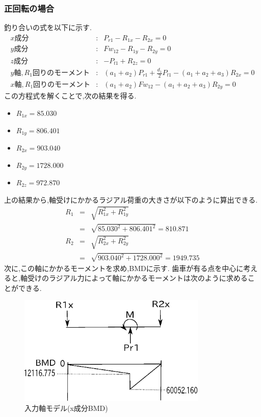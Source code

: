 \subsubsection{正回転の場合}
釣り合いの式を以下に示す.
\begin{eqnarray}
x成分&:&P_{r1}-R_{1x}-R_{2x}=0\\
y成分&:&Fw_{12}-R_{1y}-R_{2y}=0\\
z成分&:&-P_{t1}+R_{2z}=0\\
y軸,R_1回りのモーメント&:&(a_1+a_2)P_{r1}+\frac{d_1}{2}P_{t1}-(a_1+a_2+a_3)R_{2x}=0\\
x軸,R_1回りのモーメント&:&(a_1+a_2)Fw_{12}-(a_1+a_2+a_3)R_{2y}=0
\end{eqnarray}
この方程式を解くことで,次の結果を得る.


\begin{itemize}
\item $R_{1x}=85.030$
\item $R_{1y}=806.401$
\item $R_{2x}=903.040$
\item $R_{2y}=1728.000$
\item $R_{2z}=972.870$
\end{itemize}
上の結果から,軸受けにかかるラジアル荷重の大きさが以下のように算出できる.
\begin{eqnarray}
R_1 &=& \sqrt {R_{1x}^2+R_{1y}^2}\\
    &=& \sqrt {85.030^2+806.401^2}=810.871\\
R_2 &=& \sqrt {R_{2x}^2+R_{2y}^2}\\
    &=& \sqrt {903.040^2+1728.000^2}=1949.735
\end{eqnarray}
次に,この軸にかかるモーメントを求め,BMDに示す.
歯車が有る点を中心に考えると,軸受けのラジアル力によって軸にかかるモーメントは次のように求めることができる.
\begin{figure}[htbp]
\begin{center}
\includegraphics[width=9cm]{../picture/jiku14.eps}
\end{center}
\caption{入力軸モデル(x成分BMD)}
\end{figure}
